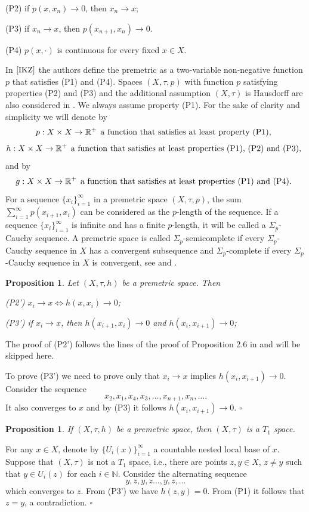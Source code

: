 \documentclass{article}
\def\ds{\displaystyle}
\def\text#1{\,\;\hbox{#1}\;\,}
\newcommand{\R}{\mathbb{R}}
\renewenvironment{proof}
         {\begin{trivlist}\item[
         {\bf Proof.}]}{{\hfill $\square$} \end{trivlist}}
\newtheorem{prop}[theo]{Proposition}
\begin{document}
    (P2) if $p(x,x_n)\to 0$, then $x_n\to x$;
    
    (P3) if $x_n\to x$, then $p(x_{n+1},x_{n})\to 0$.

    (P4) $p(x, \cdot)$ is continuous for every fixed $x \in X$.
    
In $\cite{IKZ}$ the authors define the premetric as a two-variable non-negative function $p$ that satisfies (P1) and (P4). Spaces $(X, \tau, p)$ with function $p$ satisfying properties (P2) and (P3) and the additional assumption $(X, \tau)$ is Hausdorff are also considered in \cite{IKZ}. We always assume property (P1). For the sake of clarity and simplicity we will denote by 
\[p:X\times X\to \R^+ \text{a function that satisfies at least property (P1),}\]
\[h:X\times X\to \R^+ \text{a function that satisfies at least properties (P1), (P2) and (P3),}\]
and by 
\[g:X\times X\to \R^+ \text{a function that satisfies at least properties (P1) and (P4).}\]
For a sequence $\{x_i\}_{i=1}^{\infty} $ in a premetric space $(X,\tau,p)$, the sum $\ds  \sum_{i=1}^{\infty} p(x_{i+1},x_i)$ can be considered as the $p$-length of the sequence. If a sequence $\{x_i\}_{i=1}^{\infty}$ is infinite and has a finite $p$-length, it will be called a $\Sigma_p$-Cauchy sequence. A premetric space is called  $\Sigma_p$-semicomplete if every $\Sigma_p$-Cauchy sequence in $X$ has a convergent subsequence and $\Sigma_p$-complete if every $\Sigma_p$-Cauchy sequence in $X$ is convergent, see \cite{IKZ} and \cite{Suzuki-2018}.

\begin{prop}
    \label{prop:h-def-top}
    Let $(X,\tau,h)$ be a premetric space. Then
    
    \emph{(P2')} $x_i\to x \iff h(x,x_i)\to 0$;
    
   \emph{(P3')} if $x_i\to x$, then $h(x_{i+1},x_i)\to 0$ and  $h(x_{i},x_{i+1})\to 0$; 
\end{prop}
\begin{proof}
  The proof of (P2') follows the lines of the proof of Proposition 2.6 in \cite{IKZ} and will be skipped here. 

To prove (P3') we need to prove only that $x_i\to x$ implies $h(x_{i},x_{i+1})\to 0$. Consider the sequence
 $$
        x_2,x_1,x_4,x_3,\ldots,x_{n+1},x_n,\ldots.
    $$
  It also converges to $x$ and by (P3) it follows $h(x_{i},x_{i+1})\to 0$.
\end{proof}

\begin{prop}
\label{$T_1$_space}
 If $(X,\tau,h)$ be a premetric space, then $(X,\tau)$  is a $T_1$ space.
\end{prop}
\begin{proof}
For any $x \in X$, denote by $\{U_i(x)\}_{i=1}^{\infty}$ a countable nested local base of $x$. Suppose that $(X,\tau)$ is not a $T_1$ space, i.e., there are points $z,y \in X$, $z \neq y$ such that $y \in U_i(z)$ for each $i\in\mathbb{N}$. Consider the alternating sequence
\[
y,z,y,z\dots,y,z,\dots
\]
which converges to $z$. From (P3') we have $h(z,y)=0$. From (P1) it follows that $z=y$, a contradiction.
\end{proof}
\end{document}
